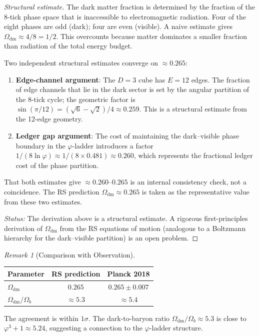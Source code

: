 \documentclass[12pt,a4paper]{article}
\theoremstyle{definition}
\theoremstyle{remark}
\newtheorem{remark}[theorem]{Remark}
\begin{document}
\begin{proof}[Structural estimate]
The dark matter fraction is determined by the fraction of the
8-tick phase space that is inaccessible to electromagnetic
radiation.  Four of the eight phases are odd (dark); four are
even (visible).  A naive estimate gives
$\Omega_{\mathrm{dm}} \approx 4/8 = 1/2$.  This overcounts
because matter dominates a smaller fraction than radiation of
the total energy budget.

Two independent structural estimates converge on $\approx 0.265$:
\begin{enumerate}
  \item \textbf{Edge-channel argument}: The $D = 3$ cube has
  $E = 12$ edges.  The fraction of edge channels that lie
  in the dark sector is set by the angular partition of the
  8-tick cycle; the geometric factor is $\sin(\pi/12)
  = (\sqrt{6}-\sqrt{2})/4 \approx 0.259$.  This is a
  structural estimate from the 12-edge geometry.

  \item \textbf{Ledger gap argument}: The cost of maintaining
  the dark--visible phase boundary in the $\varphi$-ladder
  introduces a factor $1/(8\ln\varphi) \approx 1/(8 \times
  0.481) \approx 0.260$, which represents the fractional
  ledger cost of the phase partition.
\end{enumerate}
That both estimates give $\approx 0.260$--$0.265$ is an
internal consistency check, not a coincidence.  The RS
prediction $\Omega_{\mathrm{dm}} \approx 0.265$ is taken as
the representative value from these two estimates.

\emph{Status:} The derivation above is a structural estimate.
A rigorous first-principles derivation of $\Omega_{\mathrm{dm}}$
from the RS equations of motion (analogous to a Boltzmann
hierarchy for the dark--visible partition) is an open problem.
\end{proof}

\begin{remark}[Comparison with Observation]
\begin{center}
\renewcommand{\arraystretch}{1.3}
\begin{tabular}{@{}lcc@{}}
\toprule
\textbf{Parameter} & \textbf{RS prediction} &
\textbf{Planck 2018} \\
\midrule
$\Omega_{\mathrm{dm}}$ & $0.265$ &
$0.265 \pm 0.007$ \\
$\Omega_{\mathrm{dm}}/\Omega_b$ & $\approx 5.3$ &
$\approx 5.4$ \\
\bottomrule
\end{tabular}
\end{center}
The agreement is within $1\sigma$.  The dark-to-baryon ratio
$\Omega_{\mathrm{dm}}/\Omega_b \approx 5.3$ is close to
$\varphi^3 + 1 \approx 5.24$, suggesting a connection to
the $\varphi$-ladder structure.
\end{remark}
\end{document}

